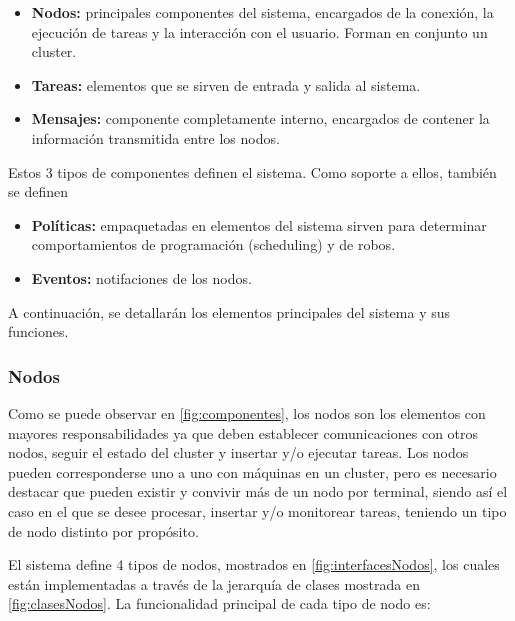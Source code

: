 \documentclass[12pt,a4paper,oneside,spanish]{report}
\begin{document}
\begin{itemize}
	\item \textbf{Nodos:} principales componentes del sistema, encargados de la conexión, la ejecución de tareas y la interacción con el usuario. Forman en conjunto un cluster.
	\item \textbf{Tareas:} elementos que se sirven de entrada y salida al sistema.
	\item \textbf{Mensajes:} componente completamente interno, encargados de contener la información transmitida entre los nodos.
\end{itemize}

Estos 3 tipos de componentes definen el sistema. Como soporte a ellos, también se definen

\begin{itemize}
	\item \textbf{Políticas:} empaquetadas en elementos del sistema sirven para determinar comportamientos de programación (scheduling) y de robos.
	\item \textbf{Eventos:} notifaciones de los nodos.
\end{itemize}

A continuación, se detallarán los elementos principales del sistema y sus funciones.

\subsubsection*{Nodos}
\label{sec:nodos}


Como se puede observar en \ref{fig:componentes}, los nodos son los elementos con mayores responsabilidades ya que deben establecer comunicaciones con otros nodos, seguir el estado del cluster y insertar y/o ejecutar tareas. Los nodos pueden corresponderse uno a uno con máquinas en un cluster, pero es necesario destacar que pueden existir y convivir más de un nodo por terminal, siendo así el caso en el que se desee procesar, insertar y/o monitorear tareas, teniendo un tipo de nodo distinto por propósito.

El sistema define 4 tipos de nodos, mostrados en \ref{fig:interfacesNodos}, los cuales están implementadas a través de la jerarquía de clases mostrada en \ref{fig:clasesNodos}. La funcionalidad principal de cada tipo de nodo es:
\end{document}
